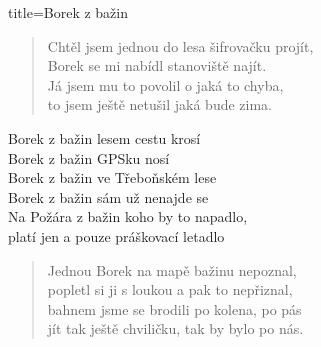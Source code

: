 \begin{song}{
    title=Borek z bažin
}

\begin{verse}
Chtěl jsem jednou do lesa šifrovačku projít, \\
Borek se mi nabídl stanoviště najít. \\
Já jsem mu to povolil o jaká to chyba, \\
to jsem ještě netušil jaká bude zima.
\end{verse}

\begin{chorus}
Borek z bažin lesem cestu krosí \\
Borek z bažin GPSku nosí \\
Borek z bažin ve Třeboňském lese \\
Borek z bažin sám už nenajde se \\
Na Požára z bažin koho by to napadlo, \\
platí jen a pouze práškovací letadlo
\end{chorus}

\begin{verse}
Jednou Borek na mapě bažinu nepoznal, \\
popletl si ji s loukou a pak to nepřiznal, \\
bahnem jsme se brodili po kolena, po pás \\
jít tak ještě chviličku, tak by bylo po nás.
\end{verse}

\begin{chorus}
\end{chorus}

\end{song}